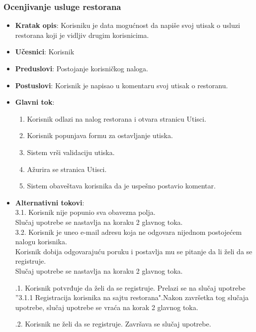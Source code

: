 \subsubsection{Ocenjivanje usluge restorana}
\begin{itemize}
    \item \textbf{Kratak opis}:
    Korisniku je data mogućnost da napiše svoj utisak o usluzi restorana koji je vidljiv drugim korisnicima.
    \item \textbf{Učesnici}:
    Korisnik
    \item \textbf{Preduslovi}:
    Postojanje korisničkog naloga. 
    \item \textbf{Postuslovi}:
    Korisnik je napisao u komentaru svoj utisak
    o restoranu.
    \item \textbf{Glavni tok}:
   \begin{enumerate}
        \item Korisnik odlazi na nalog restorana i otvara stranicu Utisci.
        \item Korisnik popunjava formu za ostavljanje utiska.
        \item Sistem vrši validaciju utiska.
        \item Ažurira se stranica Utisci.
        \item Sistem obaveštava korisnika da je uspešno postavio komentar.
    \end{enumerate}
\end{itemize}
\begin{itemize}
\item \textbf {Alternativni tokovi}:\\ 
 3.1. Korisnik nije popunio sva obavezna polja.\\
 Slučaj upotrebe se nastavlja na koraku 2 glavnog toka.\\
 3.2. Korisnik je uneo e-mail adresu koja ne odgovara nijednom postojećem nalogu korisnika. \\
 Korisnik dobija odgovarajuću poruku i postavlja mu se pitanje da li želi da se registruje. \\
 Slučaj upotrebe se nastavlja na koraku 2 glavnog toka.
 
.1. Korisnik potvrđuje da želi da se registruje.
Prelazi se na slučaj upotrebe ”3.1.1 Registracija korisnika na sajtu restorana".Nakon završetka tog slučaja upotrebe, slučaj upotrebe se vraća
na korak 2 glavnog toka. 

.2. Korisnik ne želi da se registruje. Završava se slučaj upotrebe.
\end{itemize}

